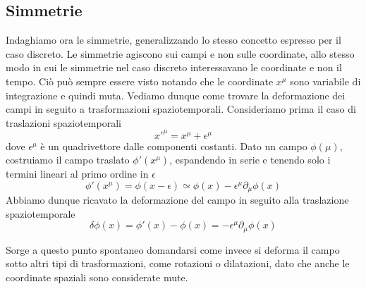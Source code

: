 \subsection{Simmetrie}
    Indaghiamo ora le simmetrie, generalizzando lo stesso concetto espresso per il caso discreto. Le simmetrie agiscono sui campi e non sulle coordinate, allo stesso modo in cui le simmetrie nel caso discreto interessavano le coordinate e non il tempo. Ciò può sempre essere visto notando che le coordinate $x^\mu$ sono variabile di integrazione e quindi muta. Vediamo dunque come trovare la deformazione dei campi in seguito a trasformazioni spaziotemporali. Consideriamo prima il caso di traslazioni spaziotemporali
\begin{equation*}
    x'^\mu = x^\mu + \epsilon^\mu
\end{equation*} 
    dove $\epsilon^\mu$ è un quadrivettore dalle componenti costanti. Dato un campo $\phi(\mu)$, costruiamo il campo traslato $\phi'(x^\mu)$, espandendo in serie e tenendo solo i termini lineari al primo ordine in $\epsilon$
\begin{equation*}
    \phi'(x^\mu) = \phi(x - \epsilon) \simeq \phi(x) - \epsilon^\mu \partial_\mu \phi(x)
\end{equation*}
    Abbiamo dunque ricavato la deformazione del campo in seguito alla traslazione spaziotemporale 
\begin{equation*}
    \delta \phi(x) = \phi'(x) - \phi(x) = -\epsilon^\mu \partial_\mu \phi (x)
\end{equation*}
    
    Sorge a questo punto spontaneo domandarsi come invece si deforma il campo sotto altri tipi di trasformazioni, come rotazioni o dilatazioni, dato che anche le coordinate spaziali sono considerate mute. 

